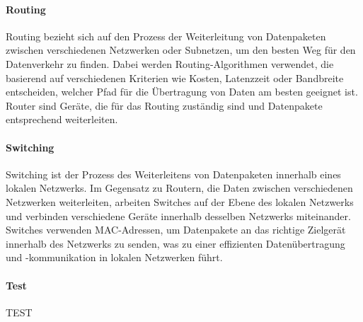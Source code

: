 \paragraph{Routing}

Routing bezieht sich auf den Prozess der Weiterleitung von Datenpaketen zwischen verschiedenen Netzwerken oder Subnetzen, um den besten Weg für den Datenverkehr zu finden. Dabei werden Routing-Algorithmen verwendet, die basierend auf verschiedenen Kriterien wie Kosten, Latenzzeit oder Bandbreite entscheiden, welcher Pfad für die Übertragung von Daten am besten geeignet ist. Router sind Geräte, die für das Routing zuständig sind und Datenpakete entsprechend weiterleiten.

\paragraph{Switching}

Switching ist der Prozess des Weiterleitens von Datenpaketen innerhalb eines lokalen Netzwerks. Im Gegensatz zu Routern, die Daten zwischen verschiedenen Netzwerken weiterleiten, arbeiten Switches auf der Ebene des lokalen Netzwerks und verbinden verschiedene Geräte innerhalb desselben Netzwerks miteinander. Switches verwenden MAC-Adressen, um Datenpakete an das richtige Zielgerät innerhalb des Netzwerks zu senden, was zu einer effizienten Datenübertragung und -kommunikation in lokalen Netzwerken führt.

\paragraph{Test}TEST

\clearpage